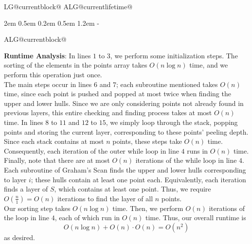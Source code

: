 \documentclass[11pt]{article}
\makeatletter
\newlength{\continueindent}
\renewenvironment{algorithmic}[1][0]%
   {%
   \edef\ALG@numberfreq{#1}%
   \def\@currentlabel{\theALG@line}%
   \setcounter{ALG@line}{0}%
   \setcounter{ALG@rem}{0}%
   \let\\\algbreak%
   \expandafter\edef\csname ALG@currentblock@\theALG@nested\endcsname{0}%
   \expandafter\let\csname ALG@currentlifetime@\theALG@nested\endcsname\relax%
   \begin{list}%
      {\ALG@step}%
      {%
      \rightmargin\z@%
      \itemsep\z@ \itemindent\z@ \listparindent2em%
      \partopsep\z@ \parskip\z@ \parsep\z@%
      \labelsep 0.5em \topsep 0.2em%
      \ifthenelse{\equal{#1}{0}}%
         {\labelwidth 0.5em}%
         {\labelwidth 1.2em}%
       \leftmargin\labelwidth \addtolength{\leftmargin}{\labelsep}
      \ALG@tlm\z@%
      }%
      \parshape 2 \leftmargin \linewidth \continueindent \dimexpr\linewidth-\continueindent\relax
   \setcounter{ALG@nested}{0}%
   \ALG@beginalgorithmic%
   }%
   {%
   \ALG@closeloops%
   \expandafter\ifnum\csname ALG@currentblock@\theALG@nested\endcsname=0\relax%
   \else%
      \PackageError{algorithmicx}{Some blocks are not closed!!!}{}%
   \fi%
   \ALG@endalgorithmic%
   \end{list}%
   }%
\makeatother
\begin{document}
\begin{enumerate}
\begin{minipage}[t]{0.9\textwidth}
\begin{algorithm}[H]
\begin{algorithmic}[1]

            
      \EndWhile
    \end{algorithmic}
    \end{algorithm}
    \end{minipage}

\vspace{1cm}

\textbf{Runtime Analysis}: In lines $1$ to $3$, we perform some initialization steps. The sorting of the elements in the points array takes $O(n \log n)$ time, and we perform this operation just once. \\

The main steps occur in lines $6$ and $7$; each subroutine mentioned takes $O(n)$ time, since each point is pushed and popped at most twice when finding the upper and lower hulls. Since we are only considering points not already found in previous layers, this entire checking and finding process takes at most $O(n)$ time. In lines $8$ to $11$ and $12$ to $15$, we simply loop through the stack, popping points and storing the current layer, corresponding to these points' peeling depth. Since each stack contains at most $n$ points, these steps take $O(n)$ time. Consequently, each iteration of the outer while loop in line $4$ runs in $O(n)$ time. \\

Finally, note that there are at most $O(n)$ iterations of the while loop in line $4$. Each subroutine of Graham's Scan finds the upper and lower hulls corresponding to layer $i$; these hulls contain at least one point each. Equivalently, each iteration finds a layer of $S$, which contains at least one point. Thus, we require $O(\frac{n}{1}) = O(n)$ iterations to find the layer of all $n$ points. \\

Our sorting step takes $O(n \log n)$ time. Then, we perform $O(n)$ iterations of the loop in line $4$, each of which run in $O(n)$ time. Thus, our overall runtime is \[O(n \log n) + O(n) \cdot O(n) = O(n^2)\] as desired. \\


\end{enumerate}
\end{document}
